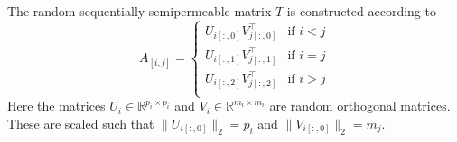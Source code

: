 \documentclass[doctype=mastersthesis,BCOR=15mm,biblatex]{ldvbook}%
\begin{document}
The random sequentially semipermeable matrix $T$ is constructed according to
\begin{equation}
	A_{[i,j]} = 
	\begin{cases}
	U_{i[:,0]} V_{j[:,0]}^\top & \text{if } i<j\\
	U_{i[:,1]} V_{j[:,1]}^\top & \text{if } i=j\\
	U_{i[:,2]} V_{j[:,2]}^\top & \text{if } i>j\\
	\end{cases}
\end{equation}
Here the matrices $U_i \in \mathbb{R}^{p_i\times p_i}$ and $V_i \in \mathbb{R}^{m_i\times m_i}$ are random orthogonal matrices. 
These are scaled such that $\|U_{i[:,0]}\|_2=p_i$ and $\|V_{i[:,0]}\|_2=m_j$.

\printbibliography{}
\end{document}
